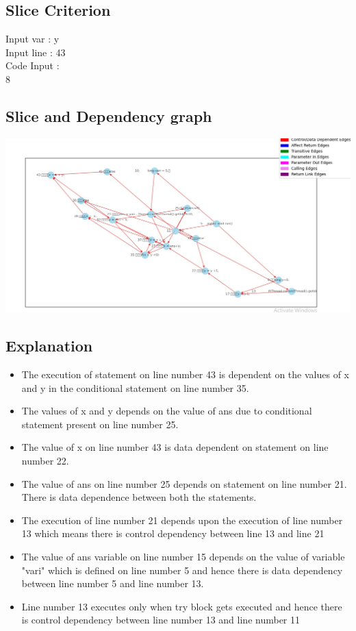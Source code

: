 \documentclass[conference]{IEEEtran}
\begin{document}
\subsection{Slice Criterion}
\begin{flushleft}
Input var : y\\
Input line : 43\\
Code Input  :\\
8
\end{flushleft}

\subsection{Slice and Dependency graph}

\includegraphics[scale=0.25]{G2.jpg}
\subsection{Explanation}
\begin{itemize}
    \item The execution of statement on line number 43 is dependent on the values of x and y in the conditional statement on line number 35.
    \item The values of x and y depends on the value of ans due to conditional statement present on line number 25.
    \item The value of x on line number 43 is data dependent on statement on line number 22.
    \item The value of ans on line number 25 depends on statement on line number 21. There is data dependence between both the statements.
    \item The execution of line number 21 depends upon the execution of line number 13 which means there is control dependency between line 13 and line 21
    \item The value of ans variable on line number 15 depends on the value of variable "vari" which is defined on line number 5 and hence there is data dependency between line number 5 and line number 13.
    \item Line number 13 executes only when try block gets executed and hence there is control dependency between line number 13 and line number 11
\end{itemize}
\end{document}
